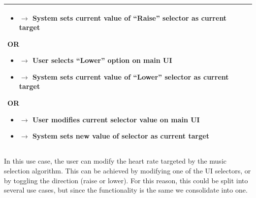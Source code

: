 \documentclass[letterpaper,english, 12pt]{scrreprt}
\begin{document}
\begin{center}
\begin{tabular}{|C{15cm}|}
\begin{itemize}
                                        \item[] $\rightarrow$ System sets current value of ``Raise'' selector as current target
                                \end{itemize}
                                OR
                                \begin{itemize}
                                        \item[] $\rightarrow$ User selects ``Lower'' option on main UI
                                        \item[] $\rightarrow$ System sets current value of ``Lower'' selector as current target
                                \end{itemize}
                                OR
                                \begin{itemize}
                                        \item[] $\rightarrow$ User modifies current selector value on main UI
                                        \item[] $\rightarrow$ System sets new value of selector as current target
                                \end{itemize}
                                
				\\
                \hline
        \end{tabular}
\end{center}
In this use case, the user can modify the heart rate targeted by the music selection algorithm. This can be achieved by modifying one of the UI selectors, or by toggling the direction (raise or lower). For this reason, this could be split into several use cases, but since the functionality is the same we consolidate into one.
\end{document}
